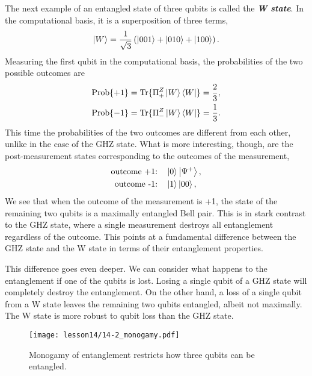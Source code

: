 The next example of an entangled state of three qubits is called the \emph{\textbf{W state}}.
In the computational basis, it is a superposition of three terms,
\begin{equation}
    \left| W \right\rangle = \frac{1}{\sqrt{3}} \left( \left| 001 \right\rangle + \left| 010 \right\rangle + \left| 100 \right\rangle \right).
\end{equation}
Measuring the first qubit in the computational basis, the probabilities of the two possible outcomes are
\begin{align}
    \text{Prob}\{+1\} & = \text{Tr} \{ \Pi^Z_+ \left| W \right\rangle\left\langle W \right| \} = \frac{2}{3}, \\
    \text{Prob}\{-1\} & = \text{Tr} \{ \Pi^Z_- \left| W \right\rangle\left\langle W \right| \} = \frac{1}{3}.
\end{align}
This time the probabilities of the two outcomes are different from each other, unlike in the case of the GHZ state.
What is more interesting, though, are the post-measurement states corresponding to the outcomes of the measurement,
\begin{align}
    \text{outcome +1:} & \quad \left| 0 \right\rangle\left| \Psi^+ \right\rangle, \label{eq:14-2_W_post_meas_0} \\
    \text{outcome -1:} & \quad \left| 1 \right\rangle\left| 00 \right\rangle,
\end{align}
We see that when the outcome of the measurement is +1, the state of the remaining two qubits is a maximally entangled Bell pair.
This is in stark contrast to the GHZ state, where a single measurement destroys all entanglement regardless of the outcome.
This points at a fundamental difference between the GHZ state and the W state in terms of their entanglement properties.

This difference goes even deeper.
We can consider what happens to the entanglement if one of the qubits is lost.
Losing a single qubit of a GHZ state will completely destroy the entanglement.
On the other hand, a loss of a single qubit from a W state leaves the remaining two qubits entangled, albeit not maximally.
The W state is more robust to qubit loss than the GHZ state.

\begin{figure}[t]
    \centering
    \texttt{[image: lesson14/14-2\_monogamy.pdf]}
    \caption[Monogamy of entanglement.]{Monogamy of entanglement restricts how three qubits can be entangled.}
    \label{fig:14-2_monogamy}
\end{figure}


